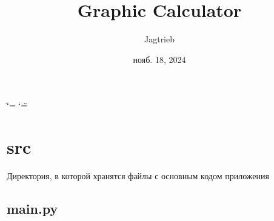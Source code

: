 \documentclass[letterpaper,10pt,russian]{sphinxmanual}
\title{Graphic Calculator}
\date{нояб. 18, 2024}
\author{Jagtrieb}
\begin{document}
\ifdefined\shorthandoff
  \ifnum\catcode`\=\string=\active\shorthandoff{=}\fi
  \ifnum\catcode`\"=\active{}\fi
\fi

\pagestyle{empty}
\sphinxmaketitle
\pagestyle{plain}
\sphinxtableofcontents
\pagestyle{normal}
\label{\detokenize{index::doc}}


\sphinxstepscope


\chapter{src}
\label{\detokenize{src:src}}\label{\detokenize{src::doc}}
\sphinxAtStartPar
Директория, в которой хранятся файлы с основным кодом приложения


\section{main.py}
\label{\detokenize{src:module-main}}\label{\detokenize{src:main-py}}
\end{document}
